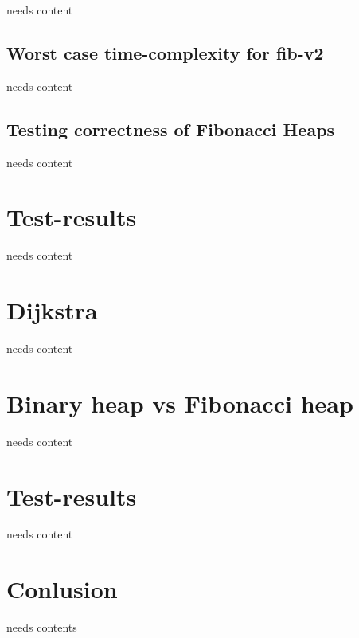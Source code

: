 \documentclass[12pt,a4paper,twoside,danish,article]{memoir}
\begin{document}
needs content

\section{Worst case time-complexity for fib-v2}

needs content

\section{Testing correctness of Fibonacci Heaps}

needs content

\chapter{Test-results}

needs content

\chapter{Dijkstra}

needs content

\chapter{Binary heap vs Fibonacci heap}

needs content

\chapter{Test-results}

needs content

\chapter{Conlusion}

needs contents
\end{document}
